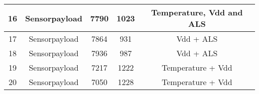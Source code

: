 \begin{tabular}{|c|c|c|c|c|}
16                   & Sensorpayload        & 7790          & 1023                   & Temperature, Vdd and ALS \\ \hline
17                   & Sensorpayload        & 7864          & 931                    & Vdd + ALS                \\ \hline
18                   & Sensorpayload        & 7936          & 987                    & Vdd + ALS                \\ \hline
19                   & Sensorpayload        & 7217          & 1222                   & Temperature + Vdd          \\ \hline
20                   & Sensorpayload        & 7050          & 1228                   & Temperature + Vdd          \\ \hline
\end{tabular}

